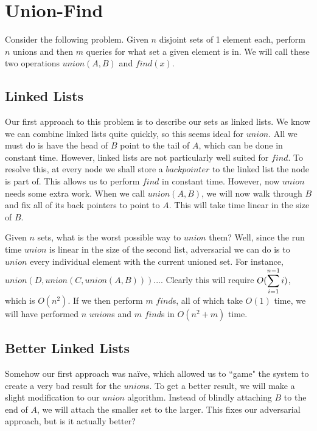 \chapter{Union-Find}

Consider the following problem. Given $n$ disjoint sets of 1 element
each, perform $n$ unions and then $m$ queries for what set a given
element is in.  We will call these two operations $union(A,B)$ and
$find(x)$.

\section{Linked Lists}

Our first approach to this problem is to describe our sets as linked
lists. We know we can combine linked lists quite quickly, so this
seems ideal for $union$.  All we must do is have the head of $B$ point
to the tail of $A$, which can be done in constant time.  However,
linked lists are not particularly well suited for $find$. To resolve
this, at every node we shall store a $back pointer$ to the linked list
the node is part of. This allows us to perform $find$ in constant
time.  However, now $union$ needs some extra work.  When we call
$union(A,B)$, we will now walk through $B$ and fix all of its back
pointers to point to $A$. This will take time linear in the size of
$B$.

Given $n$ sets, what is the worst possible way to $union$ them? Well,
since the run time $union$ is linear in the size of the second list,
adversarial we can do is to $union$ every individual element with the
current unioned set. For instance,
$union(D,union(C,union(A,B)))...$. Clearly this will require
$O(\displaystyle\sum\limits_{i=1}^{n-1}i)$, which is $O(n^2)$. If we then perform $m$
$find$s, all of which take $O(1)$ time, we will have performed $n$
$union$s and $m$ $find$s in $O(n^2 + m)$ time.

\section{Better Linked Lists}

Somehow our first approach was na\"ive, which allowed us to ``game"
the system to create a very bad result for the $union$s. To get a
better result, we will make a slight modification to our $union$
algorithm. Instead of blindly attaching $B$ to the end of $A$, we will
attach the smaller set to the larger.  This fixes our adversarial
approach, but is it actually better?

